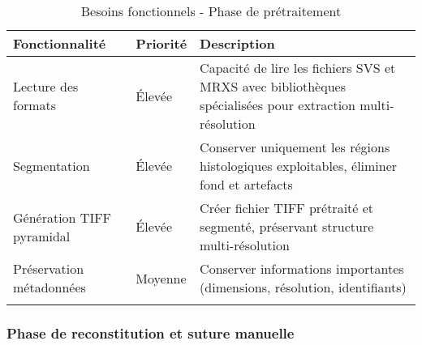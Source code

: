 \documentclass[12pt,a4paper]{report}
\begin{document}
\begin{longtable}{|p{3.5cm}|p{1.5cm}|p{9cm}|}
\hline
\rowcolor{TableHeaderColor}
\textbf{Fonctionnalité} & \textbf{Priorité} & \textbf{Description} \\
\hline
\endhead

Lecture des formats & Élevée & Capacité de lire les fichiers SVS et MRXS avec bibliothèques spécialisées pour extraction multi-résolution \\
\hline

Segmentation & Élevée & Conserver uniquement les régions histologiques exploitables, éliminer fond et artefacts \\
\hline

Génération TIFF pyramidal & Élevée & Créer fichier TIFF prétraité et segmenté, préservant structure multi-résolution \\
\hline

Préservation métadonnées & Moyenne & Conserver informations importantes (dimensions, résolution, identifiants) \\
\hline

\caption{Besoins fonctionnels - Phase de prétraitement}
\end{longtable}

\subsubsection{Phase de reconstitution et suture manuelle}
\end{document}
